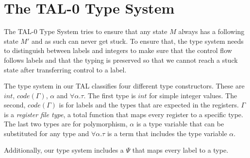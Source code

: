 \documentclass[acmlarge]{acmart}
\begin{document}
\section{The TAL-0 Type System}

The TAL-0 Type System tries to ensure that any state $M$ always has a following state $M'$ and as such can never get stuck. To ensure that, the type system needs to distinguish between labels and integers to make sure that the control flow follows labels and that the typing is preserved so that we cannot reach a stuck state after transferring control to a label.

The type system in our TAL classifies four different type constructors. These are $int$, $code(\Gamma)$, $\alpha$ and $\forall \alpha. \tau$. The first type is $int$ for simple integer values. The second, $code(\Gamma)$ is for labels and the types that are expected in the registers. $\Gamma$ is a \emph{register file type}, a total function that maps every register to a specific type. The last two types are for polymorphism, $\alpha$ is a type variable that can be substituted for any type and $\forall \alpha. \tau$ is a term that includes the type variable $\alpha$.

Additionally, our type system includes a $\Psi$ that maps every label to a type.



\end{document}
